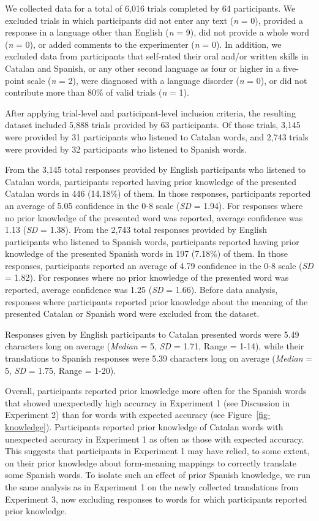 \documentclass[
]{article}
\begin{document}
We collected data for a total of 6,016 trials completed by 64
participants. We excluded trials in which participants did not enter any
text (\emph{n} = 0), provided a response in a language other than
English (\emph{n} = 9), did not provide a whole word (\emph{n} = 0), or
added comments to the experimenter (\emph{n} = 0). In addition, we
excluded data from participants that self-rated their oral and/or
written skills in Catalan and Spanish, or any other second language as
four or higher in a five-point scale (\emph{n} = 2), were diagnosed with
a language disorder (\emph{n} = 0), or did not contribute more than 80\%
of valid trials (\emph{n} = 1).

After applying trial-level and participant-level inclusion criteria, the
resulting dataset included 5,888 trials provided by 63 participants. Of
those trials, 3,145 were provided by 31 participants who listened to
Catalan words, and 2,743 trials were provided by 32 participants who
listened to Spanish words.

From the 3,145 total responses provided by English participants who
listened to Catalan words, participants reported having prior knowledge
of the presented Catalan words in 446 (14.18\%) of them. In those
responses, participants reported an average of 5.05 confidence in the
0-8 scale (\emph{SD} = 1.94). For responses where no prior knowledge of
the presented word was reported, average confidence was 1.13 (\emph{SD}
= 1.38). From the 2,743 total responses provided by English participants
who listened to Spanish words, participants reported having prior
knowledge of the presented Spanish words in 197 (7.18\%) of them. In
those responses, participants reported an average of 4.79 confidence in
the 0-8 scale (\emph{SD} = 1.82). For responses where no prior knowledge
of the presented word was reported, average confidence was 1.25
(\emph{SD} = 1.66). Before data analysis, responses where participants
reported prior knowledge about the meaning of the presented Catalan or
Spanish word were excluded from the dataset.

Responses given by English participants to Catalan presented words were
5.49 characters long on average (\emph{Median} = 5, \emph{SD} = 1.71,
Range = 1-14), while their translations to Spanish responses were 5.39
characters long on average (\emph{Median} = 5, \emph{SD} = 1.75, Range =
1-20).

Overall, participants reported prior knowledge more often for the
Spanish words that showed unexpectedly high accuracy in Experiment 1
(see Discussion in Experiment 2) than for words with expected accuracy
(see Figure~\ref{fig-knowledge}). Participants reported prior knowledge
of Catalan words with unexpected accuracy in Experiment 1 as often as
those with expected accuracy. This suggests that participants in
Experiment 1 may have relied, to some extent, on their prior knowledge
about form-meaning mappings to correctly translate some Spanish words.
To isolate such an effect of prior Spanish knowledge, we run the same
analysis as in Experiment 1 on the newly collected translations from
Experiment 3, now excluding responses to words for which participants
reported prior knowledge.
\end{document}
